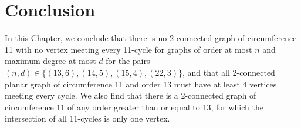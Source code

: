 \section{Conclusion}

In this Chapter, we conclude that there is no 2-connected graph of circumference 11 with no vertex meeting every 11-cycle for graphs of order at most $n$ and maximum degree at most $d$ for the pairs $(n,d)\in\{(13,6),(14,5),(15,4),(22,3)\}$, and that all 2-connected planar graph of circumference 11 and order 13 must have at least 4 vertices meeting every cycle. We also find that there is a 2-connected graph of circumference 11 of any order greater than or equal to 13, for which the intersection of all 11-cycles is only one vertex.
